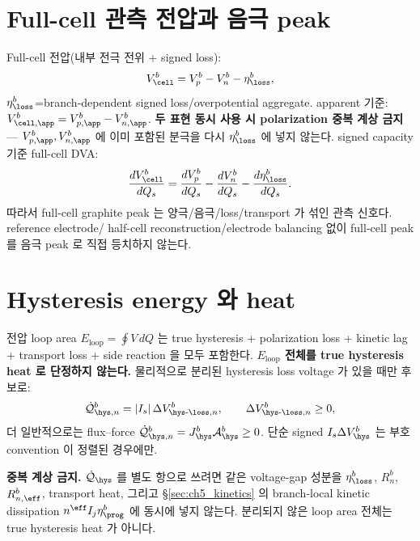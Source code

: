 \section{Full-cell 관측 전압과 음극 peak}\label{sec:ch5_fullcell}
Full-cell 전압(내부 전극 전위 + signed loss):
\begin{equation}
V_\cell^b=V_p^b-V_n^b-\eta_\loss^b,
\label{eq:ch5_fullcell}
\end{equation}
$\eta_\loss^b$=branch-dependent signed loss/overpotential aggregate. apparent 기준:
$V_{\cell,\app}^b=V_{p,\app}^b-V_{n,\app}^b$. \textbf{두 표현 동시 사용 시 polarization 중복 계상 금지} —
$V_{p,\app}^b,V_{n,\app}^b$ 에 이미 포함된 분극을 다시 $\eta_\loss^b$ 에 넣지 않는다. signed capacity 기준
full-cell DVA:
\begin{equation}
\frac{dV_\cell^b}{dQ_s}=\frac{dV_p^b}{dQ_s}-\frac{dV_n^b}{dQ_s}-\frac{d\eta_\loss^b}{dQ_s}.
\label{eq:ch5_fullcell_dva}
\end{equation}
따라서 full-cell graphite peak 는 양극/음극/loss/transport 가 섞인 관측 신호다. reference electrode/
half-cell reconstruction/electrode balancing 없이 full-cell peak 를 음극 peak 로 직접 등치하지 않는다.

\section{Hysteresis energy 와 heat}\label{sec:ch5_hysheat}
전압 loop area $E_{\mathrm{loop}}=\oint V\,dQ$ 는 true hysteresis + polarization loss + kinetic lag +
transport loss + side reaction 을 모두 포함한다. \textbf{$E_{\mathrm{loop}}$ 전체를 true hysteresis heat 로
단정하지 않는다.} 물리적으로 분리된 hysteresis loss voltage 가 있을 때만 후보로:
\begin{equation}
\dot{\mathcal Q}_{\hys,n}^b=|I_s|\,\Delta V_{\hys\text{-}\loss,n}^b,\qquad \Delta V_{\hys\text{-}\loss,n}^b\ge0,
\label{eq:ch5_hys_heat}
\end{equation}
더 일반적으로는 flux--force $\dot{\mathcal Q}_{\hys,n}^b=J_\hys^b\mathcal A_\hys^b\ge0$. 단순 signed
$I_s\Delta V_\hys^b$ 는 부호 convention 이 정렬된 경우에만.
\begin{boundbox}
\textbf{중복 계상 금지.} $\dot{\mathcal Q}_\hys$ 를 별도 항으로 쓰려면 같은 voltage-gap 성분을 $\eta_\loss^b$,
$R_n^b$, $R_{n,\eff}^b$, transport heat, 그리고 \S\ref{sec:ch5_kinetics} 의 branch-local kinetic dissipation
$n^{\eff}I_j\eta_{\prog}^b$ 에 동시에 넣지 않는다. 분리되지 않은 loop area 전체는 true hysteresis heat 가 아니다.
\end{boundbox}

